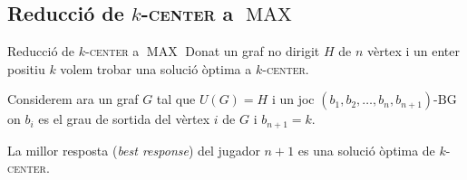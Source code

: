 \documentclass[aspectratio=169]{beamer}
\DeclareMathOperator{\MAX}{MAX}
\newcommand{\kcenter}{\texorpdfstring{$k$}{k}-\textsc{center}\xspace}
\begin{document}
\subsection{Reducció de \kcenter a \texorpdfstring{$\MAX$}{MAX}}
\begin{frame}{Reducció de \kcenter a $\MAX$}
    Donat un graf no dirigit $H$ de $n$ vèrtex i un enter positiu $k$ volem trobar una solució òptima a
    \kcenter.
    
    \vspace{2em}
    
    Considerem ara un graf $G$ tal que $U(G) = H$ i un joc $ (b_1, b_2, \dots , b_n, b_{n+1})\text{-BG} $ on
    $b_i$ es el grau de sortida del vèrtex $i$ de $G$ i $b_{n+1} = k$.
    
    \vspace{2em}
    
    La millor resposta (\emph{best response}) del jugador $n+1$ es una solució òptima de \kcenter.
    
    \note{
    }
\end{frame}

\begin{frame}
\end{frame}

\end{document}
